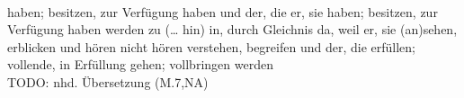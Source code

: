 \begin{exe}
\ex \label{ex:M1163} \gll {}      \object{************* }      \object{******* }      \object{***** }      \\
{haben; besitzen, zur Verfügung haben} {und} {der, die} {er, sie} {haben; besitzen, zur Verfügung haben} {werden} {} {zu (… hin)} {in, durch} {Gleichnis} {da, weil} {er, sie} {} {(an)sehen, erblicken} {und} {hören} {nicht} {hören} {} {verstehen, begreifen} {und} {der, die} {erfüllen; vollende, in Erfüllung gehen; vollbringen} {werden}\\
\glt TODO: nhd. Übersetzung (M.7,NA)
\end{exe}
